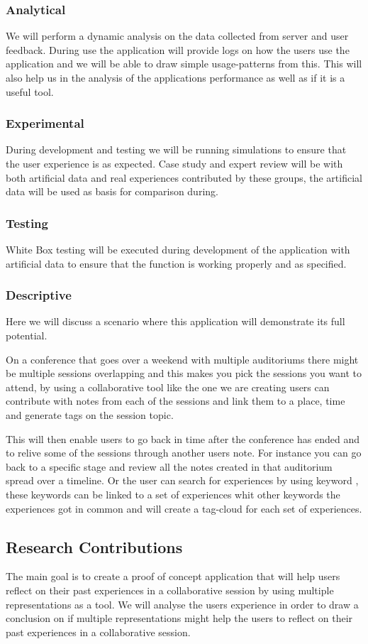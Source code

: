 \subsubsection{Analytical}
We will perform a dynamic analysis on the data collected from server and user feedback. During use the application will provide logs on how the users use the application and we will be able to draw simple usage-patterns from this. This will also help us in the analysis of the applications performance as well as if it is a useful tool.
\subsubsection{Experimental}
During development and testing we will be running simulations to ensure that the user experience is as expected. Case study and expert review will be with both artificial data and real experiences contributed by these groups, the artificial data will be used as basis for comparison during.
\subsubsection{Testing}
White Box testing will be executed during development of the application with artificial data to ensure that the function is working properly and as specified.
\subsubsection{Descriptive}
Here we will discuss a scenario where this application will demonstrate its full potential.

On a conference that goes over a weekend with multiple auditoriums there might be multiple sessions overlapping and this makes you pick the sessions you want to attend, by using a collaborative tool like the one we are creating users can contribute with notes from each of the sessions and link them to a place, time and generate tags on the session topic. 

This will then enable users to go back in time after the conference has ended and to relive some of the sessions through another users note. For instance you can go back to a specific stage and review all the notes created in that auditorium spread over a timeline. Or the user can search for experiences by using keyword \cite{Hassan-montero2006}, these keywords can be linked to a set of experiences whit other keywords the experiences got in common and will create a tag-cloud for each set of experiences.
\subsection{Research Contributions}
The main goal is to create a proof of concept application that will help users reflect on their past experiences in a collaborative session by using multiple representations as a tool. 
We will analyse the users experience in order to draw a conclusion on if multiple representations might help the users to reflect on their past experiences in a collaborative session.
